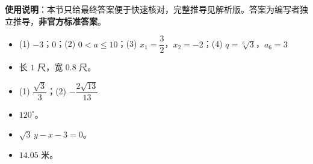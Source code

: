 
\begin{gknotice}
\textbf{使用说明}：本节只给最终答案便于快速核对，完整推导见解析版。答案为编写者独立推导，\textbf{非官方标准答案}。
\end{gknotice}

\begin{itemize}[leftmargin=2.6em]
  \item[\textbf{1.}] (1) $-3$；$0$；(2) $0<a\le10$；(3) $x_1=\dfrac32$，$x_2=-2$；(4) $q=\sqrt[6]{3}$，$a_6=3$
  \item[\textbf{2.}] 长 $1$ 尺，宽 $0.8$ 尺。
  \item[\textbf{3.}] (1) $\dfrac{\sqrt3}{3}$；(2) $-\dfrac{2\sqrt{13}}{13}$
  \item[\textbf{4.}] $120^\circ$。
  \item[\textbf{5.}] $\sqrt3\,y-x-3=0$。
  \item[\textbf{6.}] $14.05$ 米。
\end{itemize}
